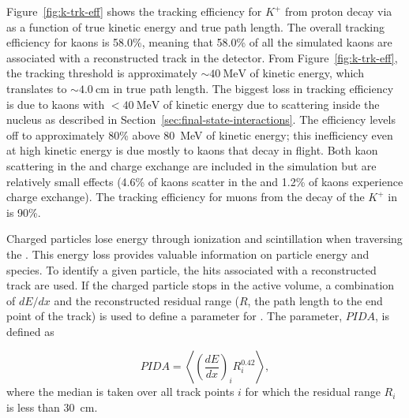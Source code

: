 Figure~\ref{fig:k-trk-eff} shows the tracking efficiency for $K^{+}$  from proton decay via \ptoknubar as a function of true kinetic energy and true path length. The overall tracking efficiency for kaons is \num{58.0}\%, meaning that \num{58.0}\% of all the simulated kaons are associated with a reconstructed track in the detector.  From Figure~\ref{fig:k-trk-eff}, the tracking threshold is approximately $\sim\SI{40}{\MeV}$ of kinetic energy, which translates to $\sim\SI{4.0}{\cm}$ in true path length.  The biggest loss in tracking efficiency is due to kaons with $<\SI{40}{\MeV}$ of kinetic energy due to scattering inside the nucleus as described in Section~\ref{sec:final-state-interactions}.  The efficiency levels off to approximately \num{80}\% above \SI{80}{\MeV} of kinetic energy; this inefficiency even at high kinetic energy is due mostly to kaons that decay in flight.
Both kaon scattering in the  and charge exchange are included in the simulation but are relatively small effects (\num{4.6}\% of kaons scatter in the  and \num{1.2}\% of kaons experience charge exchange).   The tracking efficiency for muons from the decay of the $K^{+}$ in \ptoknubar is \num{90}\%.

Charged particles lose energy through ionization and scintillation when traversing the . This energy loss provides valuable information on particle energy and species. To identify a given particle, the hits associated with a reconstructed track are used.
If the charged particle stops in the  active volume, a combination of $dE/dx$ and the reconstructed residual range ($R$, the path length to the end point of the track) is used to define a parameter for .  The parameter, $PIDA$, %
is defined as~\cite{Acciarri:2013met}  

\begin{equation}
PIDA = \left\langle \left(\frac{dE}{dx}\right)_{i}R^{0.42}_{i}\right\rangle,\label{eqn:PIDA}
\end{equation}
where the median is taken over all track points $i$ for which the residual range $R_i$ is less than \SI{30}{\cm}.

